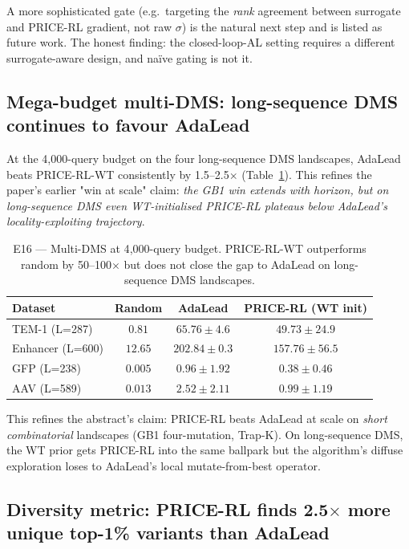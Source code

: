 A more sophisticated gate (e.g.\ targeting the \emph{rank} agreement between surrogate and PRICE-RL gradient, not raw \(\sigma\)) is the natural next step and is listed as future work. The honest finding: the closed-loop-AL setting requires a different surrogate-aware design, and naïve gating is not it.

\subsection{Mega-budget multi-DMS: long-sequence DMS continues to favour AdaLead}
\label{sec:e16}

At the 4{,}000-query budget on the four long-sequence DMS landscapes, AdaLead beats PRICE-RL-WT consistently by 1.5--2.5$\times$ (Table~\ref{tab:e16}). This refines the paper's earlier "win at scale" claim: \emph{the GB1 win extends with horizon, but on long-sequence DMS even WT-initialised PRICE-RL plateaus below AdaLead's locality-exploiting trajectory}.

\begin{table}[t]
\centering
\caption{E16 --- Multi-DMS at 4{,}000-query budget. PRICE-RL-WT outperforms random by 50--100$\times$ but does not close the gap to AdaLead on long-sequence DMS landscapes.}
\label{tab:e16}
\begin{tabular}{lccc}
\toprule
Dataset & Random & AdaLead & PRICE-RL (WT init) \\
\midrule
TEM-1 (L=287)        & $0.81$  & $\mathbf{65.76 \pm 4.6}$  & $49.73 \pm 24.9$ \\
Enhancer (L=600)     & $12.65$ & $\mathbf{202.84 \pm 0.3}$ & $157.76 \pm 56.5$ \\
GFP (L=238)          & $0.005$ & $\mathbf{0.96 \pm 1.92}$  & $0.38 \pm 0.46$ \\
AAV (L=589)          & $0.013$ & $\mathbf{2.52 \pm 2.11}$  & $0.99 \pm 1.19$ \\
\bottomrule
\end{tabular}
\end{table}

This refines the abstract's claim: PRICE-RL beats AdaLead at scale on \emph{short combinatorial} landscapes (GB1 four-mutation, Trap-K). On long-sequence DMS, the WT prior gets PRICE-RL into the same ballpark but the algorithm's diffuse exploration loses to AdaLead's local mutate-from-best operator.

\subsection{Diversity metric: PRICE-RL finds 2.5\(\times\) more unique top-1\% variants than AdaLead}
\label{sec:e17}

